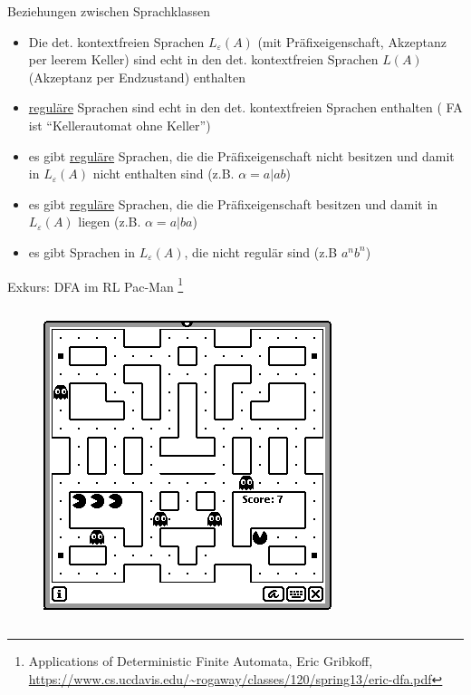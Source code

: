 \begin{frame}{Beziehungen zwischen Sprachklassen}
	\begin{itemize}
		\item Die det. kontextfreien Sprachen $L_\varepsilon(A)$ (mit Präfixeigenschaft, Akzeptanz per leerem Keller) sind echt in den det. kontextfreien Sprachen $L(A)$ (Akzeptanz per Endzustand) enthalten
		\item \underline{reguläre} Sprachen sind echt in den det. kontextfreien	Sprachen enthalten ( FA ist "`Kellerautomat ohne Keller"')
		\item es gibt \underline{reguläre} Sprachen, die die Präfixeigenschaft nicht besitzen und damit in $L_\varepsilon(A)$ nicht enthalten sind (z.B. $\alpha=a|ab$)
		\item es gibt \underline{reguläre} Sprachen, die die Präfixeigenschaft besitzen und damit in $L_\varepsilon(A)$ liegen (z.B. $\alpha=a|ba$)
		\item es gibt Sprachen in $L_\varepsilon(A)$, die nicht regulär sind (z.B ${a^nb^n}$)
	\end{itemize}
\end{frame}

\begin{frame}{Exkurs: DFA im RL}
Pac-Man \footnote{Applications of Deterministic Finite Automata, Eric Gribkoff, \url{https://www.cs.ucdavis.edu/~rogaway/classes/120/spring13/eric-dfa.pdf}}
		\begin{columns}
		\begin{figure}
			\includegraphics[width=0.6\linewidth]{images/Pac-Man}
		\end{figure}
	\end{columns}
\end{frame}

